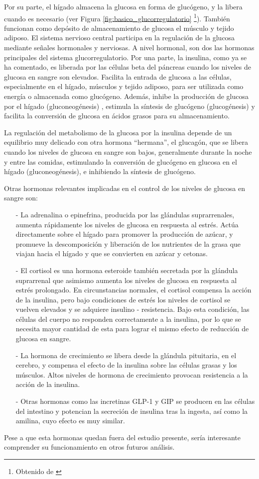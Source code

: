 Por su parte, el hígado almacena la glucosa en forma de glucógeno, y la libera cuando es necesario (ver Figura \ref{fig:basico_glucorregulatorio} \footnote{Obtenido de \cite{labster_glucose}}). También funcionan como depósito de almacenamiento de glucosa el músculo y tejido adiposo. El sistema nervioso central participa en la regulación de la glucosa mediante señales hormonales y nerviosas.
A nivel hormonal, son dos las hormonas principales del sistema glucorregulatorio. Por una parte, la insulina, como ya se ha comentado, es liberada por las células beta del páncreas cuando los niveles de glucosa en sangre son elevados. Facilita la entrada de glucosa a las células, especialmente en el hígado, músculos y tejido adiposo, para ser utilizada como energía o almacenada como glucógeno. Además, inhibe la producción de glucosa por el hígado (gluconeogénesis) , estimula la síntesis de glucógeno (glucogénesis) y facilita la conversión de glucosa en ácidos grasos para su almacenamiento.

La regulación del metabolismo de la glucosa por la insulina depende de un equilibrio muy delicado con otra hormona “hermana”, el glucagón, que se libera cuando los niveles de glucosa en sangre son bajos, generalmente durante la noche y entre las comidas, estimulando la conversión de glucógeno en glucosa en el hígado (gluconeogénesis), e inhibiendo la síntesis de glucógeno. 

Otras hormonas relevantes implicadas en el control de los niveles de glucosa en sangre son:
\begin{enumerate}
    \item[-] La adrenalina o epinefrina, producida por las glándulas suprarrenales, aumenta rápidamente los niveles de glucosa en respuesta al estrés. Actúa directamente sobre el hígado para promover la producción de azúcar, y promueve la descomposición y liberación de los nutrientes de la grasa que viajan hacia el hígado y que se convierten en azúcar y cetonas.
    \item[-] El cortisol es una hormona esteroide también secretada por la glándula suprarrenal que asimismo aumenta los niveles de glucosa en respuesta al estrés prolongado. En circunstancias normales, el cortisol compensa la acción de la insulina, pero bajo condiciones de estrés los niveles de cortisol se vuelven elevados y se adquiere insulino - resistencia. Bajo esta condición, las células del cuerpo no responden correctamente a la insulina, por lo que se necesita mayor cantidad de esta para lograr el mismo efecto de reducción de glucosa en sangre.
    \item[-] La hormona de crecimiento se libera desde la glándula pituitaria, en el cerebro, y compensa el efecto de la insulina sobre las células grasas y los músculos. Altos niveles de hormona de crecimiento provocan resistencia a la acción de la insulina.
    \item[-] Otras hormonas como las incretinas GLP-1 y GIP se producen en las células del intestino y potencian la secreción de insulina tras la ingesta, así como la amilina, cuyo efecto es muy similar.
\end{enumerate}
Pese a que esta hormonas quedan fuera del estudio presente, sería interesante comprender su funcionamiento en otros futuros análisis.

